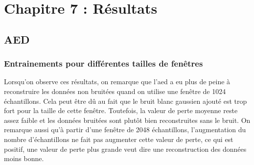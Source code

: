 \chapter{Chapitre 7 : Résultats}
\label{chap:7}

\section{AED}
\label{sec:7.1}

\subsection{Entrainements pour différentes tailles de fenêtres}

\begin{table}[H]
\end{table}

Lorsqu'on observe ces résultats, on remarque que l'\gls{aed} a eu plus de peine à reconstruire les données non bruitées quand on utilise une fenêtre de 1024 échantillons. Cela peut être dû au fait que le bruit blanc gaussien ajouté est trop fort pour la taille de cette fenêtre. Toutefois, la valeur de perte moyenne reste assez faible et les données bruitées sont plutôt bien reconstruites sans le bruit. On remarque aussi qu'à partir d'une fenêtre de 2048 échantillons, l'augmentation du nombre d'échantillons ne fait pas augmenter cette valeur de perte, ce qui est positif, une valeur de perte plus grande veut dire une reconstruction des données moins bonne.

